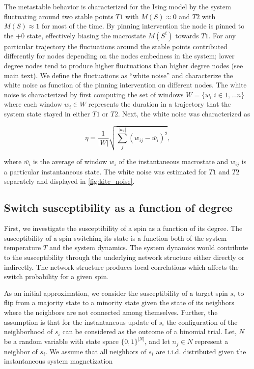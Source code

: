 \documentclass[a4paper, 11pt, twocolumn]{article}
\begin{document}
The metastable behavior is characterized for the Ising model
by the system fluctuating around two stable points $T1$ with
$M(S) \approx 0$ and $T2$ with $M(S) \approx 1$ for most of the time. By
pinning intervention  the node  is pinned  to the  +0 state,
effectively  biasing the  macrostate $M(S^t)$  towards $T1$.
For any  particular trajectory  the fluctuations  around the
stable points contributed differently for nodes depending on
the nodes embedness  in the system; lower  degree nodes tend
to produce higher fluctuations than higher degree nodes (see
main text). We define the  fluctuations as ``white noise'' and
characterize  the white  noise  as function  of the  pinning
intervention  on   different  nodes.  The  white   noise  is
characterized by  first computing  the set  of windows  $W =
\{w_i  | i\in  1,  \dots  n\}$ where  each  window  $w_i \in  W$
represents  the duration  in  a trajectory  that the  system
state stayed  in either $T1$  or $T2$. Next, the  white noise
was characterized as

\begin{equation}
\label{}
\eta = \frac{1}{|W|} \sqrt{ \sum_j^{|w_i|} (w_{ij} - \overline{w_i})^2},
\end{equation}

where $\overline{w_i}$  is the  average of window  $w_i$ of
the instantaneous  macrostate and  $w_{ij}$ is  a particular
instantaneous state. The white  noise was estimated for $T1$
and $T2$ separately and displayed in \cref{fig:kite_noise}.

\subsection{Switch susceptibility as a function of degree}
\label{sec:org009e10c}
First,  we investigate  the susceptibility  of a  spin as  a
function  of  its  degree.  The  susceptibility  of  a  spin
switching  its  state  is  a function  both  of  the  system
temperature $T$ and the system dynamics. The system dynamics
would   contribute  to   the   susceptibility  through   the
underlying network structure  either directly or indirectly.
The  network  structure  produces local  correlations  which
affects the switch probability for a given spin.

As an initial approximation,  we consider the susceptibility
of a  target spin $s_i$ to  flip from a majority  state to a
minority state  given the state  of its neighbors  where the
neighbors are  not connected among themselves.  Further, the
assumption is that for the instantaneous update of $s_i$ the
configuration of the neighborhood of $s_i$ can be considered
as the  outcome of a  binomial trial.  Let, $N$ be  a random
variable with state space $\{0,  1\}^{|N|}$, and let $n_j \in N$
represent a neighbor of $s_i$.  We assume that all neighbors
of  $s_i$ are  i.i.d.  distributed  given the  instantaneous
system magnetization
\end{document}
